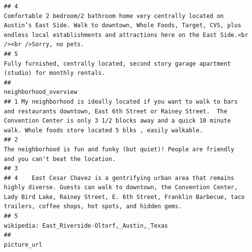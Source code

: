 \documentclass[
]{article}
\begin{document}
\begin{verbatim}
## 4                                                                                                                                                                                                                                                         Comfortable 2 bedroom/2 bathroom home very centrally located on Austin’s East Side. Walk to downtown, Whole Foods, Target, CVS, plus endless local establishments and attractions here on the East Side.<br /><br />Sorry, no pets.
## 5                                                                                                                                                                                                                                                                                                                                                                                             Fully furnished, centrally located, second story garage apartment (studio) for monthly rentals.
##                                                                                                                                                                                                                                         neighborhood_overview
## 1 My neighborhood is ideally located if you want to walk to bars and restaurants downtown, East 6th Street or Rainey Street.  The Convention Center is only 3 1/2 blocks away and a quick 10 minute walk. Whole foods store located 5 blks , easily walkable.
## 2                                                                                                                                                        The neighborhood is fun and funky (but quiet)! People are friendly  and you can't beat the location.
## 3                                                                                                                                                                                                                                                            
## 4    East Cesar Chavez is a gentrifying urban area that remains highly diverse. Guests can walk to downtown, the Convention Center, Lady Bird Lake, Rainey Street, E. 6th Street, Franklin Barbecue, taco trailers, coffee shops, hot spots, and hidden gems.
## 5                                                                                                                                                                                                             wikipedia: East_Riverside-Oltorf,_Austin,_Texas
##                                                                                               picture_url

\end{verbatim}
\end{document}
